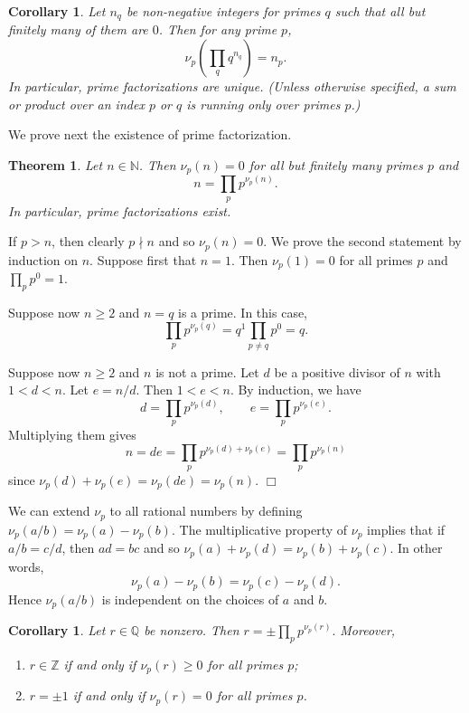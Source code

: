 \documentclass{article}
\def\Z{{\mathbb Z}}
\def\N{{\mathbb N}}
\def\Q{{\mathbb Q}}
\def\Z{{\mathbb Z}}
\def\Q{{\mathbb Q}}
\newtheorem{theorem}[subsection]{Theorem}
\newtheorem{cor}[subsection]{Corollary}
\newenvironment{proof}{\noindent {\bf Proof:}}{$\Box$ \vspace{2 ex}}
\begin{document}
\begin{cor}
    Let $n_q$ be non-negative integers for primes $q$ such that all but finitely many of them are $0$. Then for any prime $p$,
    $$\nu_p\left(\prod_q q^{n_q}\right) = n_p.$$
    In particular, prime factorizations are unique. (Unless otherwise specified, a sum or product over an index $p$ or $q$ is running only over primes $p$.)
\end{cor}

We prove next the existence of prime factorization.






\begin{theorem}
    Let $n\in\N$. Then $\nu_p(n) = 0$ for all but finitely many primes $p$ and $$n = \prod_{p}p^{\nu_p(n)}.$$
    In particular, prime factorizations exist.
\end{theorem}

\begin{proof}
    If $p>n$, then clearly $p\nmid n$ and so $\nu_p(n)=0$.
    We prove the second statement by induction on $n$. Suppose first that $n = 1$. Then $\nu_p(1) = 0$ for all primes $p$ and $\prod_p p^0 = 1$.

    Suppose now $n\geq 2$ and $n=q$ is a prime. In this case, $$\prod_p p^{\nu_p(q)} = q^1 \prod_{p\neq q} p^0 = q.$$

    Suppose now $n\geq2$ and $n$ is not a prime. Let $d$ be a positive divisor of $n$ with $1<d<n$. Let $e = n/d$. Then $1<e<n$. By induction, we have $$d = \prod_{p}p^{\nu_p(d)},\qquad e = \prod_{p}p^{\nu_p(e)}.$$ Multiplying them gives $$n = de = \prod_p p^{\nu_p(d)+\nu_p(e)} = \prod_p p^{\nu_p(n)}$$
    since $\nu_p(d)+\nu_p(e) = \nu_p(de) = \nu_p(n).$
\end{proof}

We can extend $\nu_p$ to all rational numbers by defining $\nu_p(a/b) = \nu_p(a) - \nu_p(b).$ The multiplicative property of $\nu_p$ implies that if $a/b = c/d$, then $ad = bc$ and so $\nu_p(a) + \nu_p(d) = \nu_p(b) + \nu_p(c)$. In other words,  $$\nu_p(a) - \nu_p(b) = \nu_p(c) - \nu_p(d).$$
Hence $\nu_p(a/b)$ is independent on the choices of $a$ and $b$.

\begin{cor}
    Let $r\in\Q$ be nonzero. Then $\displaystyle r = \pm\prod_p p^{\nu_p(r)}.$ Moreover,
    \begin{enumerate}
        \item $r\in\Z$ if and only if $\nu_p(r)\geq 0$ for all primes $p$;
        \item $r = \pm 1$ if and only if $\nu_p(r) = 0$ for all primes $p$.
    \end{enumerate}
\end{cor}
\end{document}
